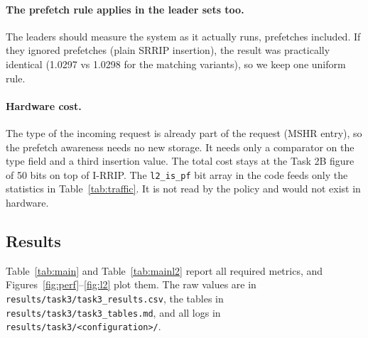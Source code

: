 \documentclass[11pt]{article}
\begin{document}
\paragraph{The prefetch rule applies in the leader sets too.} The leaders should measure the
system as it actually runs, prefetches included. If they ignored prefetches (plain SRRIP insertion),
the result was practically identical (1.0297 vs 1.0298 for the matching variants), so we keep one
uniform rule.

\paragraph{Hardware cost.} The type of the incoming request is already part of the request (MSHR
entry), so the prefetch awareness needs no new storage. It needs only a comparator on the type
field and a third insertion value. The total cost stays at the Task 2B figure of 50 bits on top
of I-RRIP. The \texttt{l2\_is\_pf} bit array in the code feeds only the statistics in
Table~\ref{tab:traffic}. It is not read by the policy and would not exist in hardware.

\subsection{Results}
\label{sec:results}

Table~\ref{tab:main} and Table~\ref{tab:mainl2} report all required metrics, and
Figures~\ref{fig:perf}--\ref{fig:l2} plot them. The raw values are in
\texttt{results/task3/task3\_results.csv}, the tables in \texttt{results/task3/task3\_tables.md},
and all logs in \texttt{results/task3/<configuration>/}.
\end{document}
